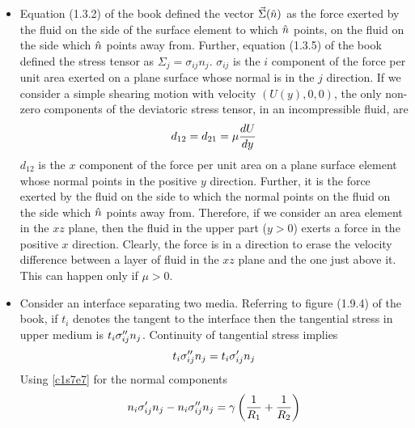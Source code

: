 \begin{itemize}
\item Equation (1.3.2) of the book defined the vector $\vec\Sigma(\hat{n})$ as the force exerted by the fluid on the side of the surface element to which $\hat{n}$ points, on the fluid on the
side which $\hat{n}$ points away from. Further, equation (1.3.5) of the book defined the stress tensor as $\Sigma_j = \sigma_{ij}n_j$. $\sigma_{ij}$ is the $i$ component of the force per
unit area exerted on a plane surface whose normal is in the $j$ direction. If we consider a simple shearing motion with velocity $(U(y), 0, 0)$, the only non-zero components of the
deviatoric stress tensor, in an incompressible fluid, are
\[
d_{12} = d_{21} = \mu\frac{d{U}}{d{y}}
\]
$d_{12}$ is the $x$ component of the force per unit area on a plane surface element whose normal points in the positive $y$ direction. Further, it is the force exerted by the fluid on 
the side to which the normal points on the fluid on the side which $\hat{n}$ points away from. Therefore, if we consider an area element in the $xz$ plane, then the fluid in the upper part
($y > 0$) exerts a force in the positive $x$ direction. Clearly, the force is in a direction to erase the velocity difference between a layer of fluid in the $xz$ plane and the one just
above it. This can happen only if $\mu > 0$.

\item Consider an interface separating two media. Referring to figure (1.9.4) of the book, if $t_i$ denotes the tangent to the interface then the tangential stress in upper medium is
$t_i\sigma^{\prime\prime}_{ij}n_j$. Continuity of tangential stress implies
\begin{equation}\label{c3s3e8}
t_i\sigma^{\prime\prime}_{ij}n_j = t_i\sigma^\prime_{ij}n_j
\end{equation}
Using \eqref{c1s7e7} for the normal components
\begin{equation}\label{c3s3e9}
n_i\sigma^\prime_{ij}n_j - n_i\sigma^{\prime\prime}_{ij}n_j = \gamma\left(\frac{1}{R_1} + \frac{1}{R_2}\right)
\end{equation}
\end{itemize}

